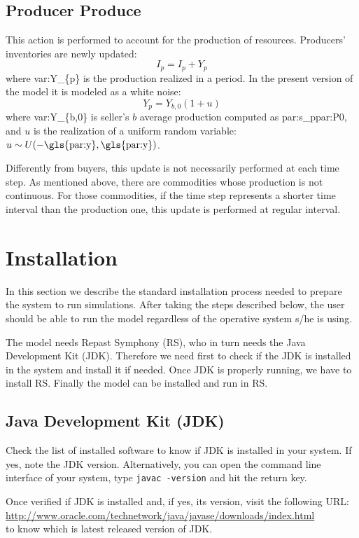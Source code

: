 \documentclass{article}
\begin{document}
\subsection{Producer Produce}

This action is performed to account for the production of resources. Producers' inventories are newly updated:
\[
I_p=I_p+Y_p
\]
where \gls{var:Y_{p}} is the production realized in a period. In the present version of the model it is modeled as a white noise:
\[
	Y_p=Y_{b,0}(1+u)
\]
where \gls{var:Y_{b,0}} is seller's $b$ average production computed as \gls{par:s_p}\gls{par:P0},  
and $u$ is the realization of a uniform random variable: $u\sim U(-\textnormal{\gls{par:y}},\textnormal{\gls{par:y}})$.

Differently from buyers, this update is not necessarily performed at each time step.
As mentioned above, there are commodities whose production is not continuous. For those commodities, if the time step represents a shorter time interval than the production one, this update is performed at regular interval.


\section{Installation}

In this section we describe the standard installation process needed to prepare the system to run simulations. After taking the steps described below, the user should be able to run the model regardless of the operative system s/he is using.

The model needs Repast Symphony (RS), who in turn needs the Java Development Kit (JDK). Therefore we need first to check if the JDK is installed in the system and install it if needed. Once JDK is properly running, we have to install RS. Finally the model can be installed and run in RS.

\subsection{Java Development Kit (JDK)}

Check the list of installed software to know if JDK is installed in your system. If yes, note the JDK version.
Alternatively, you can open the command line interface of your system, type \verb+javac -version+ and hit the return key. 

Once verified if JDK is installed and, if yes, its version, visit the following URL:\\
\url{http://www.oracle.com/technetwork/java/javase/downloads/index.html}\\
to know which is latest released version of JDK.
\end{document}
